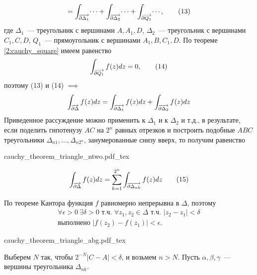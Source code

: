 \documentclass[main]{subfiles}
\begin{document}
\begin{longProof}
\begin{multline*}
        = \AnClOrInt[\AnClOrCurve[\partial \Delta_1]] \dotsi + \AnClOrInt[\AnClOrCurve[\partial \Delta_2]] \dotsi + \AnClOrInt[\AnClOrCurve[\partial Q_1]] \dotsi, \tag{13}
    \end{multline*}
    где $\Delta_1$~--- треугольник с вершинами $A, A_1, D$, $\Delta_2$~--- треугольник с вершинами $C_1, C, D$, $Q_1$~--- прямоугольник с вершинами $A_1, B, C_1, D$.
    По теореме \ref{2:cauchy_square} имеем равенство
    \[\AnClOrInt[\AnClOrCurve[\partial Q_1]] f(z) dz = 0, \tag{14}\]
    поэтому (13) и (14) $\implies$
    \[ \AnClOrInt[\AnClOrCurve[\partial \Delta]] f(z) dz = \AnClOrInt[\AnClOrCurve[\partial \Delta_1]] f(z) dz + \AnClOrInt[\AnClOrCurve[\partial \Delta_2]] f(z) dz\]
    Приведенное рассуждение можно применить к $\Delta_1$ и к $\Delta_2$ и т.д., в результате, если поделить гипотенузу $AC$ на $2^n$ равных отрезков и построить подобные $ABC$ треугольники $\Delta_{n1}, \dotsc, \Delta_{n2^n}$, занумерованные снизу вверх, то получим равенство

    \begin{minipage}{0.3\textwidth}
        \begin{center}
            {cauchy_theorem_triangle_ntwo.pdf_tex}
        \end{center}
    \end{minipage}
    \begin{minipage}{0.6\textwidth}
        \[\AnClOrInt[\AnClOrCurve[\partial \Delta]] f(z) dz = \sum_{k=1}^{2^n} \AnClOrInt[\AnClOrCurve[\partial \Delta_{nk}]] f(z) dz \tag{15}\]
    \end{minipage}

    По теореме Кантора функция $f$ равномерно непрерывна в $\Delta$, поэтому
    \begin{multline*}
        \forall \epsilon > 0\ \exists \delta > 0 \text{ т.ч. } \forall z_1, z_2 \in \Delta \text{ т.ч. } |z_2 - z_1| < \delta \\
        \text{выполнено } |f(z_2) - f(z_1)| < \epsilon.
    \end{multline*}
    \begin{minipage}{0.45\textwidth}
        \begin{center}
            \def\svgwidth{0.5\textwidth}
            {cauchy_theorem_triangle_abg.pdf_tex}
        \end{center}
    \end{minipage}
    \begin{minipage}{0.45\textwidth}
        Выберем $N$ так, чтобы $2^{-N} |C - A| < \delta$, и возьмем $n > N$.
        Пусть $\alpha, \beta, \gamma$~--- вершины треугольника $\Delta_{nk}$.
    \end{minipage}


\end{longProof}
\end{document}

